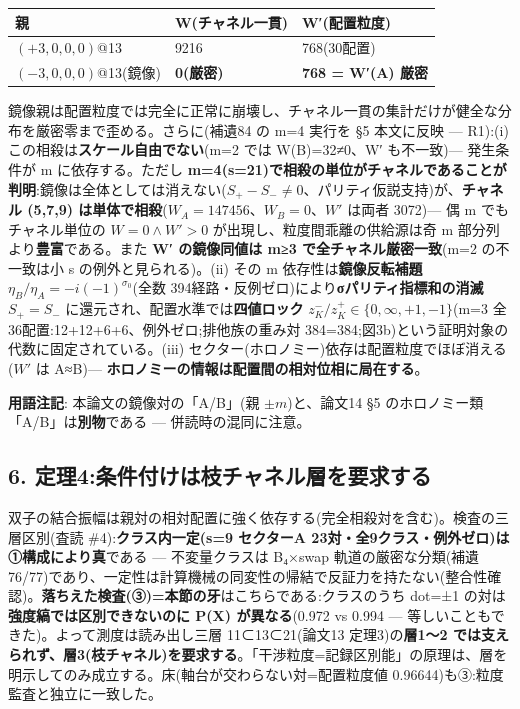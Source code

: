\documentclass[
]{ltjsarticle}
\newcounter{none} %
\begin{document}
{\def\LTcaptype{none} %
\begin{longtable}[]{@{}lll@{}}
\toprule\noalign{}
親 & W(チャネル一貫) & W′(配置粒度) \\
\midrule\noalign{}
\endhead
\bottomrule\noalign{}
\endlastfoot
\((+3,0,0,0)\)@13 & 9216 & 768(30配置) \\
\((-3,0,0,0)\)@13(鏡像) & \textbf{0(厳密)} & \textbf{768 = W′(A)
厳密} \\
\end{longtable}
}

鏡像親は配置粒度では完全に正常に崩壊し、チャネル一貫の集計だけが健全な分布を厳密零まで歪める。さらに(補遺84
の m=4 実行を §5 本文に反映 --- R1):(i)
この相殺は\textbf{スケール自由でない}(m=2 では W(B)=32≠0、W′
も不一致)--- 発生条件が m に依存する。ただし
\textbf{m=4(s=21)で相殺の単位がチャネルであることが判明}:鏡像は全体としては消えない(\(S_+-S_-\neq0\)、パリティ仮説支持)が、\textbf{チャネル
(5,7,9) は単体で相殺}(\(W_A=147456\)、\(W_B=0\)、\(W'\) は両者 3072)---
偶 m でもチャネル単位の \(W=0\wedge W'>0\)
が出現し、粒度間乖離の供給源は奇 m 部分列より\textbf{豊富}である。また
\textbf{W′ の鏡像同値は m≥3 で全チャネル厳密一致}(m=2 の不一致は小 s
の例外と見られる)。(ii) その m 依存性は\textbf{鏡像反転補題}
\(\eta_B/\eta_A=-i(-1)^{\sigma_0}\)(全数
394経路・反例ゼロ)により\textbf{σパリティ指標和の消滅} \(S_+=S_-\)
に還元され、配置水準では\textbf{四値ロック}
\(z^-_K/z^+_K\in\{0,\infty,+1,-1\}\)(m=3
全36配置:12+12+6+6、例外ゼロ;排他族の重み対
384=384;図3b)という証明対象の代数に固定されている。(iii)
セクター(ホロノミー)依存は配置粒度でほぼ消える(\(W'\) は A≈B)---
\textbf{ホロノミーの情報は配置間の相対位相に局在する}。

\textbf{用語注記}: 本論文の鏡像対の「A/B」(親 \(\pm m\))と、論文14 §5
のホロノミー類「A/B」は\textbf{別物}である --- 併読時の混同に注意。

\subsection{6.
定理4:条件付けは枝チャネル層を要求する}\label{ux5b9aux74064ux6761ux4ef6ux4ed8ux3051ux306fux679dux30c1ux30e3ux30cdux30ebux5c64ux3092ux8981ux6c42ux3059ux308b}

双子の結合振幅は親対の相対配置に強く依存する(完全相殺対を含む)。検査の三層区別(査読
\#4):\textbf{クラス内一定(s=9 セクターA
23対・全9クラス・例外ゼロ)は①構成により真}である --- 不変量クラスは
B₄×swap
軌道の厳密な分類(補遺76/77)であり、一定性は計算機械の同変性の帰結で反証力を持たない(整合性確認)。\textbf{落ちえた検査(③)=本節の牙}はこちらである:クラスのうち
dot=±1 の対は\textbf{強度縞では区別できないのに P(X) が異なる}(0.972 vs
0.994 --- 等しいこともできた)。よって測度は読み出し三層 11⊂13⊂21(論文13
定理3)の\textbf{層1〜2
では支えられず、層3(枝チャネル)を要求する}。「干渉粒度=記録区別能」の原理は、層を明示してのみ成立する。床(軸台が交わらない対=配置粒度値
0.96644)も③:粒度監査と独立に一致した。
\end{document}

